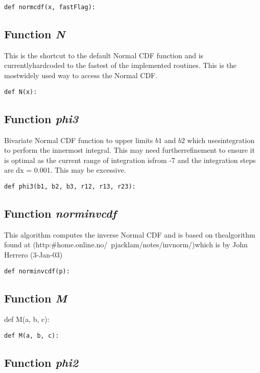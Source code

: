 \documentclass[twoside,11pt]{book}
\begin{document}
\begin{lstlisting}
def normcdf(x, fastFlag):
\end{lstlisting}

\subsection{Function {\it N}}
This is the shortcut to the default Normal CDF function and is currentlyhardcoded to the fastest of the implemented routines. This is the mostwidely used way to access the Normal CDF. 

\begin{lstlisting}
def N(x):
\end{lstlisting}

\subsection{Function {\it phi3}}
Bivariate Normal CDF function to upper limits $b1$ and $b2$ which usesintegration to perform the innermost integral. This may need furtherrefinement to ensure it is optimal as the current range of integration isfrom -7 and the integration steps are dx = 0.001. This may be excessive. 

\begin{lstlisting}
def phi3(b1, b2, b3, r12, r13, r23):
\end{lstlisting}

\subsection{Function {\it norminvcdf}}
This algorithm computes the inverse Normal CDF and is based on thealgorithm found at (http:\#home.online.no/~pjacklam/notes/invnorm/)which is by John Herrero (3-Jan-03) 

\begin{lstlisting}
def norminvcdf(p):
\end{lstlisting}

\subsection{Function {\it M}}
def M(a, b, c):

\begin{lstlisting}
def M(a, b, c):
\end{lstlisting}

\subsection{Function {\it phi2}}
\end{document}
